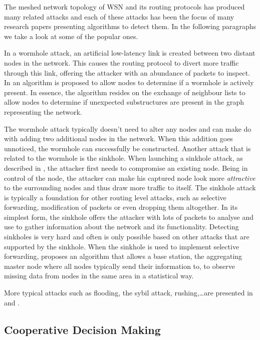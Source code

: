 \documentclass[conference]{IEEEtran}
\begin{document}
The meshed network topology of WSN and its routing protocols has produced many
related attacks and each of these attacks has been the focus of many research
papers presenting algorithms to detect them. In the following paragraphs we
take a look at some of the popular ones.

In a wormhole attack, an artificial low-latency link is created between two
distant nodes in the network. This causes the routing protocol to divert more
traffic through this link, offering the attacker with an abundance of packets
to inspect. In \cite{maheshwari2007detecting} an algorithm is proposed to allow
nodes to determine if a wormhole is actively present. In essence, the algorithm
resides on the exchange of neighbour lists to allow nodes to determine if
unexpected substructures are present in the graph representing the network.

The wormhole attack typically doesn't need to alter any nodes and can make do
with adding two additional nodes in the network. When this addition goes
unnoticed, the wormhole can successfully be constructed. Another attack that is
related to the wormhole is the sinkhole. When launching a sinkhole attack, as
described in \cite{krontiris2008launching}, the attacker first needs to
compromise an existing node. Being in control of the node, the attacker can
make his captured node look more \emph{attractive} to the surrounding nodes and
thus draw more traffic to itself. The sinkhole attack is typically a foundation
for other routing level attacks, such as selective forwarding, modification of
packets or even dropping them altogether. In its simplest form, the sinkhole
offers the attacker with lots of packets to analyse and use to gather
information about the network and its functionality. Detecting sinkholes is
very hard and often is only possible based on other attacks that are supported
by the sinkhole. When the sinkhole is used to implement selective forwarding,
\cite{ngai2006intruder} proposes an algorithm that allows a base station, the
aggregating master node where all nodes typically send their information to, to
observe missing data from nodes in the same area in a statistical way.

More typical attacks such as flooding, the sybil attack, rushing,\dots are
presented in \cite{wood2002denial} and \cite{djenouri2005survey}.

\subsection{Cooperative Decision Making}
\label{subsection:coorperative}
\end{document}
